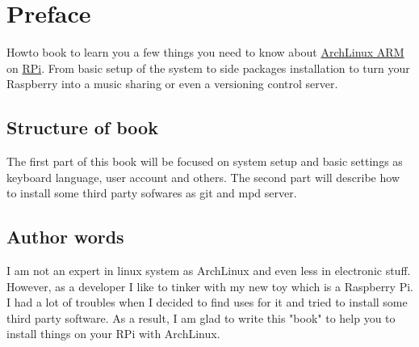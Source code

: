 \chapter*{Preface}
Howto book to learn you a few things you need to know about 
\href{http://archlinuxarm.org/platforms/armv6/raspberry-pi}{ArchLinux ARM} 
on \href{http://www.raspberrypi.org/help/what-is-a-raspberry-pi/}{RPi}. 
From basic setup of the system to side packages installation to turn 
your Raspberry into a music sharing or even a versioning control server.

\section*{Structure of book}
The first part of this book will be focused on system setup and 
basic settings as keyboard language, user account and others. 
The second part will describe how to install some third party sofwares 
as git and mpd server.

\section*{Author words}
I am not an expert in linux system as ArchLinux and even less in electronic 
stuff. However, as a developer I like to tinker with my new toy which is 
a Raspberry Pi. I had a lot of troubles when I decided to find uses for it 
and tried to install some third party software. As a result, I am glad to 
write this "book" to help you to install things on your RPi with ArchLinux.
